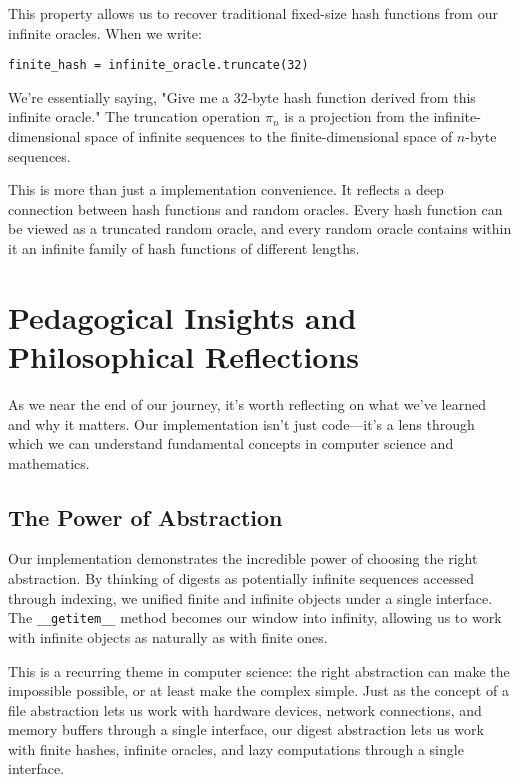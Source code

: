 \documentclass[11pt]{article}
\begin{document}
This property allows us to recover traditional fixed-size hash functions from our infinite oracles. When we write:

\begin{lstlisting}
finite_hash = infinite_oracle.truncate(32)
\end{lstlisting}

We're essentially saying, "Give me a 32-byte hash function derived from this infinite oracle." The truncation operation $\pi_n$ is a projection from the infinite-dimensional space of infinite sequences to the finite-dimensional space of $n$-byte sequences.

This is more than just a implementation convenience. It reflects a deep connection between hash functions and random oracles. Every hash function can be viewed as a truncated random oracle, and every random oracle contains within it an infinite family of hash functions of different lengths.

\section{Pedagogical Insights and Philosophical Reflections}

As we near the end of our journey, it's worth reflecting on what we've learned and why it matters. Our implementation isn't just code---it's a lens through which we can understand fundamental concepts in computer science and mathematics.

\subsection{The Power of Abstraction}

Our implementation demonstrates the incredible power of choosing the right abstraction. By thinking of digests as potentially infinite sequences accessed through indexing, we unified finite and infinite objects under a single interface. The \texttt{\_\_getitem\_\_} method becomes our window into infinity, allowing us to work with infinite objects as naturally as with finite ones.

This is a recurring theme in computer science: the right abstraction can make the impossible possible, or at least make the complex simple. Just as the concept of a file abstraction lets us work with hardware devices, network connections, and memory buffers through a single interface, our digest abstraction lets us work with finite hashes, infinite oracles, and lazy computations through a single interface.
\end{document}
